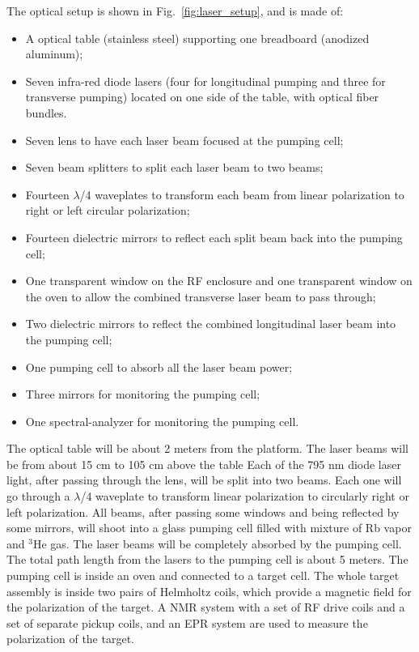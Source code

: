 The optical setup is shown in Fig.~\ref{fig:laser_setup}, and is made of:
\begin {itemize}
\item A optical table (stainless steel) supporting one breadboard 
(anodized aluminum);
\item Seven infra-red diode lasers (four for longitudinal pumping and three 
for transverse pumping) located on one side of the table, with optical 
fiber bundles.
\item Seven lens to have each laser beam focused at the pumping cell;
\item Seven beam splitters to split each laser beam to two beams;
\item Fourteen $\lambda$/4 waveplates to transform each beam from
linear polarization to right or left circular polarization;
\item Fourteen dielectric mirrors to reflect each split beam back into the pumping cell;
\item One transparent window on the RF enclosure and one transparent window 
on the oven to allow the combined transverse laser beam to pass through;
\item Two dielectric mirrors to reflect the combined longitudinal 
laser beam into the pumping cell;
\item One pumping cell to absorb all the laser beam power;
\item Three mirrors for monitoring the pumping cell;
\item One spectral-analyzer for monitoring the pumping cell.
\end {itemize}

The optical table will be about 2 meters from the platform.
The laser beams will be from about 15 cm to 105 cm above the table
Each of the 795 nm diode laser light, after passing through the lens,
will be split into two beams. Each one will go through a $\lambda$/4 waveplate
to transform linear polarization to circularly right or left polarization. 
All beams, after passing some windows and being reflected by some mirrors,  
will shoot into a glass pumping cell filled with
mixture of Rb vapor and $^3$He gas. The laser beams will be completely absorbed
by the pumping cell. The total path length from the lasers to the pumping cell
is about 5 meters. The pumping cell is inside an oven and 
connected to a target cell. The whole target assembly is inside two pairs of
Helmholtz coils, which provide a magnetic field for the polarization of the
target. A NMR system with a set of RF drive coils and a set of separate 
pickup coils, and an EPR system 
are used to measure the polarization of the target.


